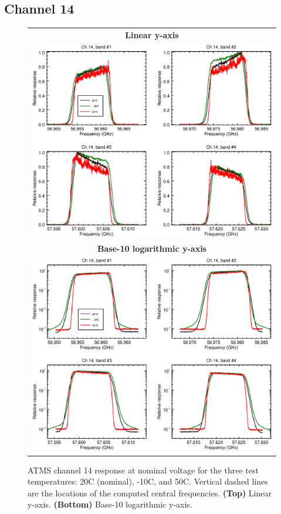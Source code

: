 \subsection{Channel 14}
\begin{figure}[H]
  \label{fig:Tset.ch14_response}
  \centering
  \begin{tabular}{c}
    \hspace{0.75cm}\sffamily\textbf{Linear y-axis} \\
    \includegraphics[scale=0.55]{graphics/srf/Tset/lin/atms_npp-14.eps} \\
    \hspace{0.75cm}\sffamily\textbf{Base-10 logarithmic y-axis} \\
    \includegraphics[scale=0.55]{graphics/srf/Tset/log/atms_npp-14.eps}
  \end{tabular}
  \caption{ATMS channel 14 response at nominal voltage for the three test temperatures: 20\textdegree{}C (nominal), -10\textdegree{}C, and 50\textdegree{}C. Vertical dashed lines are the locations of the computed central frequencies. \textbf{(Top)} Linear y-axis. \textbf{(Bottom)} Base-10 logarithmic y-axis.}
\end{figure}

